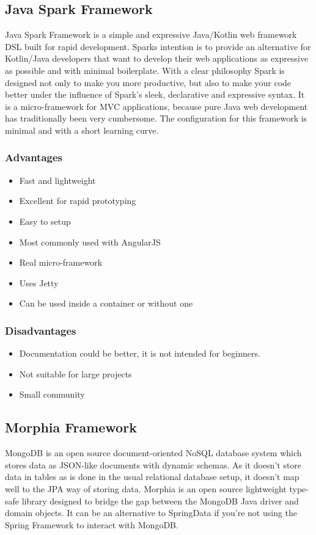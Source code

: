 \documentclass[a4paper, hidelinks, 12pt]{report}
\begin{document}
\subsection{Java Spark Framework} Java Spark Framework is a simple and expressive Java/Kotlin web framework DSL built for rapid development. Sparks intention is to provide an alternative for Kotlin/Java developers that want to develop their web applications as expressive as possible and with minimal boilerplate. With a clear philosophy Spark is designed not only to make you more productive, but also to make your code better under the influence of Spark’s sleek, declarative and expressive syntax. It is a micro-framework for MVC applications, because pure Java web development has traditionally been very cumbersome. The configuration for this framework is minimal and with a short learning curve.

\subsubsection{Advantages}
		\begin{itemize}
		\item{} Fast and lightweight
	\item{} Excellent for rapid prototyping
	\item{} Easy to setup
	\item{} Most commonly used with AngularJS
	\item{} Real micro-framework
	\item{} Uses Jetty
	\item{} Can be used inside a container or without one
		\end{itemize}
\subsubsection{Disadvantages}
			\begin{itemize}
		\item{} Documentation could be better, it is not intended for beginners.
		\item{} Not suitable for large projects
		\item{} Small community
		\end{itemize}

\subsection{Morphia Framework} MongoDB is an open source document-oriented NoSQL database system which stores data as JSON-like documents with dynamic schemas.  As it doesn't store data in tables as is done in the usual relational database setup, it doesn't map well to the JPA way of storing data. Morphia is an open source lightweight type-safe library designed to bridge the gap between the MongoDB Java driver and domain objects. It can be an alternative to SpringData if you're not using the Spring Framework to interact with MongoDB.
\end{document}
